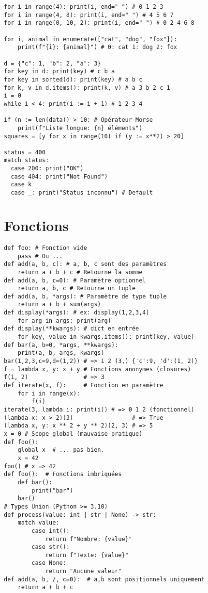 \documentclass{article}
\begin{document}
\begin{multicols*}{4}
\begin{lstlisting}
for i in range(4): print(i, end=" ") # 0 1 2 3
for i in range(4, 8): print(i, end=" ") # 4 5 6 7
for i in range(0, 10, 2): print(i, end=" ") # 0 2 4 6 8

for i, animal in enumerate(["cat", "dog", "fox"]):
    print(f"{i}: {animal}") # 0: cat 1: dog 2: fox

d = {"c": 1, "b": 2, "a": 3}
for key in d: print(key) # c b a
for key in sorted(d): print(key) # a b c
for k, v in d.items(): print(k, v) # a 3 b 2 c 1
i = 0
while i < 4: print(i := i + 1) # 1 2 3 4

if (n := len(data)) > 10: # Opérateur Morse
    print(f"Liste longue: {n} éléments")
squares = [y for x in range(10) if (y := x**2) > 20]

status = 400
match status:
  case 200: print("OK")
  case 404: print("Not Found")
  case k
  case _: print("Status inconnu") # Default
\end{lstlisting}

\section*{Fonctions}
\begin{lstlisting}
def foo: # Fonction vide
    pass # Ou ...
def add(a, b, c): # a, b, c sont des paramètres
    return a + b + c # Retourne la somme
def add(a, b, c=0): # Paramètre optionnel
    return a, b, c # Retourne un tuple
def add(a, b, *args): # Paramètre de type tuple
    return a + b + sum(args)
def display(*args): # ex: display(1,2,3,4)
    for arg in args: print(arg)
def display(**kwargs): # dict en entrée
    for key, value in kwargs.items(): print(key, value)
def bar(a, b=0, *args, **kwargs):
    print(a, b, args, kwargs)
bar(1,2,3,c=9,d=(1,2)) # => 1 2 (3,) {'c':9, 'd':(1, 2)}
f = lambda x, y: x + y # Fonctions anonymes (closures)
f(1, 2)                # => 3
def iterate(x, f):     # Fonction en paramètre
    for i in range(x):
        f(i)
iterate(3, lambda i: print(i)) # => 0 1 2 (fonctionnel)
(lambda x: x > 2)(3)                 # => True
(lambda x, y: x ** 2 + y ** 2)(2, 3) # => 5
x = 0 # Scope global (mauvaise pratique)
def foo():
    global x  # ... pas bien.
    x = 42
foo() # x => 42
def foo():  # Fonctions imbriquées
    def bar():
        print("bar")
    bar()
# Types Union (Python >= 3.10)
def process(value: int | str | None) -> str:
    match value:
        case int():
            return f"Nombre: {value}"
        case str():
            return f"Texte: {value}"
        case None:
            return "Aucune valeur"
def add(a, b, /, c=0):  # a,b sont positionnels uniquement
    return a + b + c
\end{lstlisting}


\end{multicols*}
\end{document}
